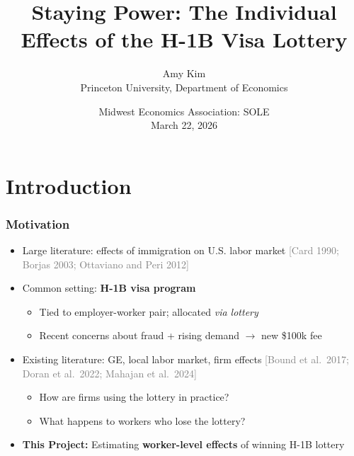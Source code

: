 \documentclass[xcolor=dvipsnames, compress, 12pt, aspectratio=169, presentation]{beamer}
\title{Staying Power: The Individual Effects of the H-1B Visa Lottery}
\author{Amy Kim \\ \small Princeton University, Department of Economics}
\date{Midwest Economics Association: SOLE \\ March 22, 2026}
\begin{document}
\begin{frame}[plain]
    \titlepage
    \addtocounter{framenumber}{-1}
\end{frame}

\section{Introduction}
\begin{frame}
    \frametitle{Motivation}
    \begin{itemize}
        \item Large literature: effects of immigration on U.S. labor market \textcolor{gray}{\footnotesize [Card 1990; Borjas 2003; Ottaviano and Peri 2012]}
        \vspace{4mm}
        \item Common setting: \textbf{H-1B visa program} %
        \begin{itemize}
            \item Tied to employer-worker pair; allocated \textit{via lottery}
            \item Recent concerns about fraud + rising demand $\rightarrow$ new \$100k fee
        \end{itemize}
        \vspace{4mm}
        \item Existing literature: GE, local labor market, firm effects \textcolor{gray}{\footnotesize [Bound et al.\ 2017; Doran et al.\ 2022; Mahajan et al.\ 2024]} %
        \begin{itemize}
            \item How are firms using the lottery in practice? 
            \item What happens to workers who lose the lottery?
        \end{itemize}
        \vspace{4mm}
        \item \textcolor{maincolor}{\textbf{This Project:}} Estimating \textbf{worker-level effects} of winning H-1B lottery
    \end{itemize}
\end{frame}
\end{document}
